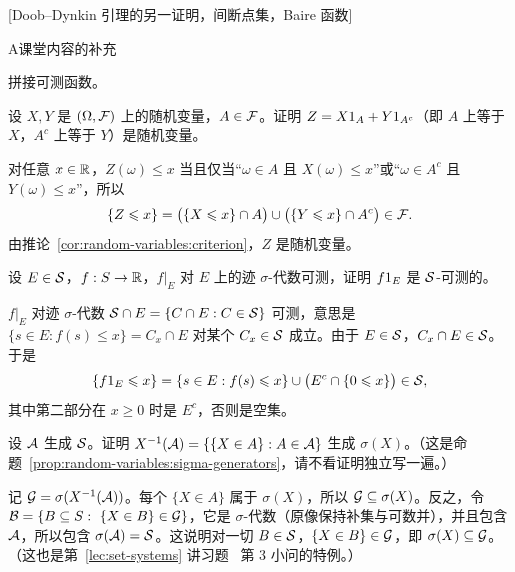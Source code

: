 [Doob–Dynkin 引理的另一证明，间断点集，Baire 函数]
\label{hw:random-variables}


\begin{exercises}{A}{课堂内容的补充}
\item\label{ex:random-variables:A1} 拼接可测函数。
\begin{questions}
\item 设 $X,Y$ 是 $(\Omega,\mathcal{F})$ 上的随机变量，$A\in\mathcal{F}$。证明 $Z=X1_A+Y1_{A^c}$（即 $A$ 上等于 $X$，$A^c$ 上等于 $Y$）是随机变量。
\begin{solution}
对任意 $x\in\mathbb{R}$，$Z(\omega)\leqslant x$ 当且仅当“$\omega\in A$ 且 $X(\omega)\leqslant x$”或“$\omega\in A^c$ 且 $Y(\omega)\leqslant x$”，所以
\[
\{Z\leqslant x\}=\bigl(\{X\leqslant x\}\cap A\bigr)\cup\bigl(\{Y\leqslant x\}\cap A^c\bigr)\in\mathcal{F} .
\]
由推论~\ref{cor:random-variables:criterion}，$Z$ 是随机变量。
\end{solution}
\item 设 $E\in\mathcal{S}$，$f:S\to\mathbb{R}$，$f|_E$ 对 $E$ 上的迹 $\sigma$-代数可测，证明 $f1_E$ 是 $\mathcal{S}$-可测的。
\begin{solution}
$f|_E$ 对迹 $\sigma$-代数 $\mathcal{S}\cap E=\{C\cap E:C\in\mathcal{S}\}$ 可测，意思是 $\{s\in E:f(s)\leqslant x\}=C_x\cap E$ 对某个 $C_x\in\mathcal{S}$ 成立。由于 $E\in\mathcal{S}$，$C_x\cap E\in\mathcal{S}$。于是
\[
\{f1_E\leqslant x\}=\{s\in E:f(s)\leqslant x\}\cup\bigl(E^c\cap\{0\leqslant x\}\bigr)\in\mathcal{S},
\]
其中第二部分在 $x\geqslant0$ 时是 $E^c$，否则是空集。
\end{solution}
\end{questions}

\item\label{ex:random-variables:A2} 设 $\mathcal{A}$ 生成 $\mathcal{S}$。证明 $X^{-1}(\mathcal{A})=\{\{X\in A\}:A\in\mathcal{A}\}$ 生成 $\sigma(X)$。（这是命题~\ref{prop:random-variables:sigma-generators}，请不看证明独立写一遍。）
\begin{solution}
记 $\mathcal{G}=\sigma(X^{-1}(\mathcal{A}))$。每个 $\{X\in A\}$ 属于 $\sigma(X)$，所以 $\mathcal{G}\subseteq\sigma(X)$。反之，令 $\mathcal{B}=\{B\subseteq S:\ \{X\in B\}\in\mathcal{G}\}$，它是 $\sigma$-代数（原像保持补集与可数并），并且包含 $\mathcal{A}$，所以包含 $\sigma(\mathcal{A})=\mathcal{S}$。这说明对一切 $B\in\mathcal{S}$，$\{X\in B\}\in\mathcal{G}$，即 $\sigma(X)\subseteq\mathcal{G}$。（这也是第~\ref{lec:set-systems} 讲习题~ 第 3 小问的特例。）
\end{solution}


\end{exercises}
